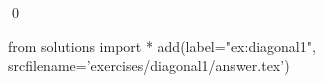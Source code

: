
\begin{ex} 
  \label{ex:diagonal1}
  
  \qed
\end{ex} 
\begin{python0}
from solutions import *
add(label="ex:diagonal1",
    srcfilename='exercises/diagonal1/answer.tex') 
\end{python0}
